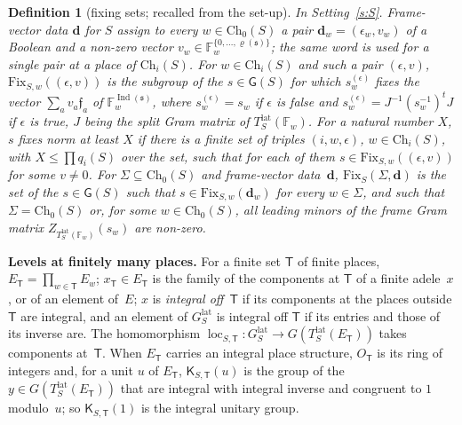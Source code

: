 \documentclass[11pt,a4paper]{article}
\newcommand{\F}{\mathbb{F}}
\newcommand{\m}[1]{\mbox{$#1$}}        %
\newcommand{\subhead}[1]{\par\addvspace{9pt plus 2pt}\Needspace{4\baselineskip}\noindent\textbf{#1}\enspace\ignorespaces}
\theoremstyle{plainx}
\theoremstyle{uprightx}
\newtheorem{definition}[theorem]{Definition}
\newcommand{\fs}{\mathfrak{s}}                      %
\newcommand{\sT}{\mathsf{T}}                        %
\newcommand{\rh}[1]{\varrho(#1)}                    %
\newcommand{\Ix}[1]{\operatorname{Ind}(#1)}                          %
\newcommand{\ET}[1]{E_{#1}}                         %
\newcommand{\qS}[2]{q_{#2}(#1)}                     %
\newcommand{\ChS}[2]{\mathrm{Ch}_{#2}(#1)}          %
\newcommand{\Tlat}[2]{T^{\mathrm{lat}}_{#1}(#2)}    %
\newcommand{\GFin}[1]{G^{\mathrm{lat}}_{#1}}        %
\newcommand{\GRes}[1]{\mathsf{G}(#1)}               %
\newcommand{\fixset}[3]{\mathrm{Fix}_{#1}(#2,#3)}   %
\newcommand{\vfix}[3]{\mathrm{Fix}_{#1,#2}(#3)}     %
\newcommand{\loc}[2]{\operatorname{loc}_{#1,#2}}    %
\newcommand{\KT}[3]{\mathsf{K}_{#1,#2}(#3)}                  %
\begin{document}
\begin{definition}[fixing sets; recalled from the set-up]\label{d:fix}
In Setting~\ref{s:S}. \emph{Frame-vector data} $\mathbf d$ for $S$ assign to every \m{w\in\ChS{S}{0}} a pair
\m{\mathbf d_w=(\epsilon_w,v_w)} of a Boolean and a non-zero vector \m{v_w\in\F_w^{\{0,\dots,\rh{\fs}\}}}; the same
word is used for a single pair at a place of \m{\ChS{S}{i}}. For \m{w\in\ChS{S}{i}} and such a pair
\m{(\epsilon,v)}, \m{\vfix{S}{w}{(\epsilon,v)}} is the subgroup of the \m{s\in\GRes{S}} for which
\m{s_w^{(\epsilon)}} fixes the vector \m{\sum_a v_a\mathfrak f_a} of \m{\F_w^{\Ix{\fs}}}, where
\m{s_w^{(\epsilon)}=s_w} if $\epsilon$ is false and \m{s_w^{(\epsilon)}=J^{-1}(s_w^{-1})^{t}J} if $\epsilon$ is
true, $J$ being the split Gram matrix of \m{\Tlat{S}{\F_w}}. For a natural number $X$, \emph{$s$ fixes norm at
least $X$} if there is a finite set of triples \m{(i,w,\epsilon)}, \m{w\in\ChS{S}{i}}, with
\m{X\le\prod\qS{S}{i}} over the set, such that for each of them \m{s\in\vfix{S}{w}{(\epsilon,v)}} for some
\m{v\ne0}. For \m{\Sigma\subseteq\ChS{S}{0}} and frame-vector data~$\mathbf d$,
\m{\fixset{S}{\Sigma}{\mathbf d}} is the set of the \m{s\in\GRes{S}} such that
\m{s\in\vfix{S}{w}{\mathbf d_w}} for every \m{w\in\Sigma}, and such that \m{\Sigma=\ChS{S}{0}} or, for some
\m{w\in\ChS{S}{0}}, all leading minors of the frame Gram matrix \m{Z_{\Tlat{S}{\F_w}}(s_{w})} are non-zero.
\end{definition}

\subhead{Levels at finitely many places.} For a finite set $\sT$ of finite places, \m{\ET{\sT}=\prod_{w\in\sT}E_w};
\m{x_{\sT}\in\ET{\sT}} is the family of the components at $\sT$ of a finite adele~$x$, or of an element of~$E$;
$x$ is \emph{integral off~$\sT$} if its components at the places outside $\sT$ are integral, and an element of
\m{\GFin{S}} is integral off $\sT$ if its entries and those of its inverse are. The homomorphism
\m{\loc{S}{\sT}\colon\GFin{S}\to G(\Tlat{S}{\ET{\sT}})} takes components at~$\sT$. When \m{\ET{\sT}} carries an
integral place structure, $O_{\sT}$ is its ring of integers and, for a unit $u$ of \m{\ET{\sT}}, \m{\KT{S}{\sT}{u}}
is the group of the \m{y\in G(\Tlat{S}{\ET{\sT}})} that are integral with integral inverse and congruent to $1$
modulo~$u$; so \m{\KT{S}{\sT}{1}} is the integral unitary group.
\end{document}
